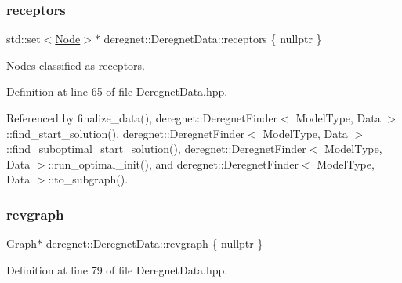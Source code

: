 \mbox{\label{classderegnet_1_1DeregnetData_a470cc9f84741c59897ab1e7a3daa1205}} 
\subsubsection{\texorpdfstring{receptors}{receptors}}
{\footnotesize\ttfamily std\+::set$<$\hyperlink{namespacederegnet_a744bad34f2de9856d36715a445f027f3}{Node}$>$$\ast$ deregnet\+::\+Deregnet\+Data\+::receptors \{ nullptr \}}



Nodes classified as \textquotesingle{}receptors\textquotesingle{}. 



Definition at line 65 of file Deregnet\+Data.\+hpp.



Referenced by finalize\+\_\+data(), deregnet\+::\+Deregnet\+Finder$<$ Model\+Type, Data $>$\+::find\+\_\+start\+\_\+solution(), deregnet\+::\+Deregnet\+Finder$<$ Model\+Type, Data $>$\+::find\+\_\+suboptimal\+\_\+start\+\_\+solution(), deregnet\+::\+Deregnet\+Finder$<$ Model\+Type, Data $>$\+::run\+\_\+optimal\+\_\+init(), and deregnet\+::\+Deregnet\+Finder$<$ Model\+Type, Data $>$\+::to\+\_\+subgraph().

\mbox{\label{classderegnet_1_1DeregnetData_a4b6a17e13aeda78317ff37567e7fd26d}} 
\subsubsection{\texorpdfstring{revgraph}{revgraph}}
{\footnotesize\ttfamily \hyperlink{namespacederegnet_a55b76c55bbabc682cbc61f8b9948799e}{Graph}$\ast$ deregnet\+::\+Deregnet\+Data\+::revgraph \{ nullptr \}\hspace{0.3cm}{\ttfamily [private]}}



Definition at line 79 of file Deregnet\+Data.\+hpp.

\mbox{\label{classderegnet_1_1DeregnetData_ad15bd1f0e5ab9d01b82b5c696203b855}} 
